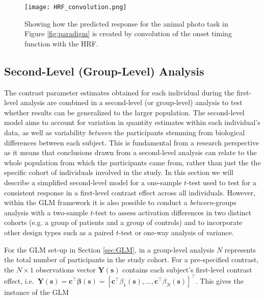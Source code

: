 \begin{figure}[!ht]
\centering
	\texttt{[image: HRF\_convolution.png]}
\caption{Showing how the predicted response for the animal photo task in Figure \ref{fig:paradigm} is created by convolution of the onset timing function with the HRF.}
\label{fig:convolution}
\end{figure}

\subsection{Second-Level (Group-Level) Analysis}
\label{sec:group_level}

The contrast parameter estimates obtained for each individual during the first-level analysis are combined in a second-level (or group-level) analysis to test whether results can be generalized to the larger population. The second-level model aims to account for variation in quantity estimates within each individual's data, as well as variability \textit{between} the participants stemming from biological differences between each subject.  This is fundamental from a research perspective as it means that conclusions drawn from a second-level analysis can relate to the whole population from which the participants came from, rather than just the the specific cohort of individuals involved in the study. In this section we will describe a simplified second-level model for a one-sample $t$-test used to test for a consistent response in a first-level contrast effect across all individuals. However, within the GLM framework it is also possible to conduct a \textit{between}-groups analysis with a two-sample $t$-test to assess activation differences in two distinct cohorts (e.g. a group of patients and a group of controls) and to incorporate other design types such as a paired $t$-test or one-way analysis of variance.   

For the GLM set-up in Section \ref{sec:GLM}, in a group-level analysis $N$ represents the total number of participants in the study cohort. For a pre-specified contrast, the $N \times 1$ observations vector $\bm{Y}(\bm{s})$ contains each subject's first-level contrast effect, i.e.\ $\bm{Y}(\bm{s}) = \bm{c}^{\intercal}\bm{\beta}(\bm{s}) = [\bm{c}^{\intercal}\beta_{1}(\bm{s}), ..., \bm{c}^{\intercal}\beta_{N}(\bm{s})]^{\intercal}$. This gives the instance of the GLM 

